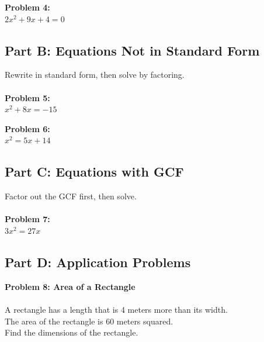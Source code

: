 \documentclass[12pt]{article}
\begin{document}
			\textbf{Problem 4:}\\
            
            $2x^2 + 9x + 4 = 0$

			\newpage

		\subsection*{Part B: Equations Not in Standard Form}

			Rewrite in standard form, then solve by factoring.\\\\

			\textbf{Problem 5:}\\
            
            $x^2 + 8x = -15$

			\vspace{3cm}

			\textbf{Problem 6:}\\
            
            $x^2 = 5x + 14$

			\vspace{3cm}

		\subsection*{Part C: Equations with GCF}

			Factor out the GCF first, then solve.\\\\

			\textbf{Problem 7:}\\
            
            $3x^2 = 27x$

			\newpage

		\subsection*{Part D: Application Problems}

			\textbf{Problem 8: Area of a Rectangle}\\\\

			A rectangle has a length that is 4 meters more than its width.\\

			The area of the rectangle is 60 meters squared.\\

			Find the dimensions of the rectangle.\\\\
\end{document}
